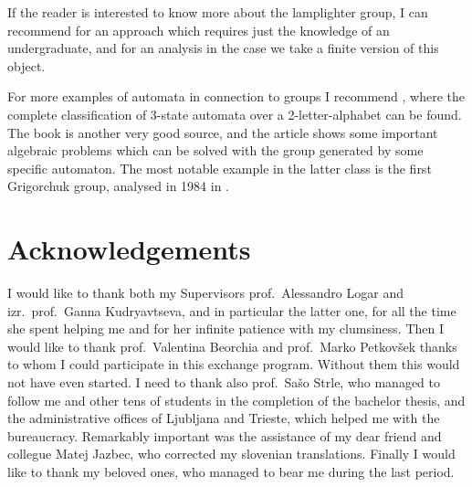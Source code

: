 \documentclass[mat1]{fmfdeloTS2.0}
\begin{document}
If the reader is interested to know more about the lamplighter group, I can recommend \cite{1} for an approach which requires just the knowledge of an undergraduate, and \cite{12} for an analysis in the case we take a finite version of this object. 

For more examples of automata in connection to groups I recommend \cite{2}, where the complete classification of 3-state automata over a 2-letter-alphabet can be found. The book \cite{10} is another very good source, and the article \cite{13} shows some important algebraic problems which can be solved with the group generated by some specific automaton. The most notable example in the latter class is the first Grigorchuk group, analysed in 1984 in \cite{6}.

\section*{Acknowledgements}
I would like to thank both my Supervisors prof.\ Alessandro Logar and izr.\ prof.\ Ganna Kudryavtseva, and in particular the latter one, for all the time she spent helping me and for her infinite patience with my clumsiness. Then I would like to thank prof.\ Valentina Beorchia and prof.\ Marko Petkovšek thanks to whom I could participate in this exchange program. Without them this would not have even started. I need to thank also prof.\ Sašo Strle, who managed to follow me and other tens of students in the completion of the bachelor thesis, and the administrative offices of Ljubljana and Trieste, which helped me with the bureaucracy. Remarkably important was the assistance of my dear friend and collegue Matej Jazbec, who corrected my slovenian translations. Finally I would like to thank my beloved ones, who managed to bear me during the last period.
\end{document}
